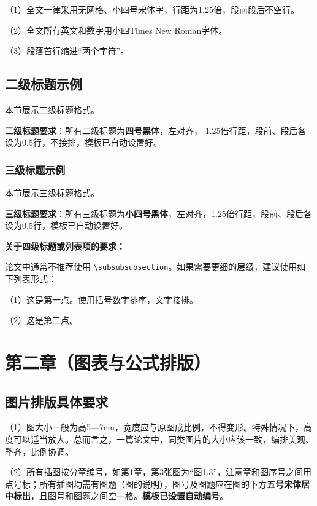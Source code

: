 \documentclass[]{WTUthesis}
\begin{document}
（1）全文一律采用无网格、小四号宋体字，行距为1.25倍，段前段后不空行。

（2）全文所有英文和数字用小四Times New Roman字体。

（3）段落首行缩进“两个字符”。


\section{二级标题示例}
本节展示二级标题格式。

\textbf{二级标题要求}：所有二级标题为\textbf{四号黑体}，左对齐， 1.25倍行距，段前、段后各设为0.5行，不接排，模板已自动设置好。

\subsection{三级标题示例}
本节展示三级标题格式。

\textbf{三级标题要求}：所有三级标题为\textbf{小四号黑体}，左对齐，1.25倍行距，段前、段后各设为0.5行，模板已自动设置好。

\vspace{1em} %
\noindent\textbf{关于四级标题或列表项的要求：}

论文中通常不推荐使用 \texttt{\textbackslash subsubsubsection}。如果需要更细的层级，建议使用如下列表形式：

（1）这是第一点。使用括号数字排序，文字接排。

（2）这是第二点。


\chapter{第二章（图表与公式排版）}

\section{图片排版具体要求}
（1）图大小一般为高5—7cm，宽度应与原图成比例，不得变形。特殊情况下，高度可以适当放大。总而言之，一篇论文中，同类图片的大小应该一致，编排美观、整齐，比例协调。

（2）所有插图按分章编号，如第1章，第3张图为“图1.3”，注意章和图序号之间用点号标；所有插图均需有图题（图的说明），图号及图题应在图的下方\textbf{五号宋体居中标出}，且图号和图题之间空一格。\textbf{模板已设置自动编号}。
\end{document}
